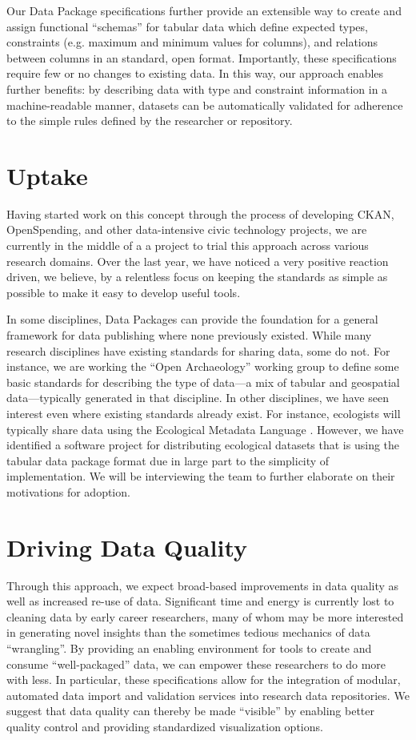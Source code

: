 \documentclass{idcc}
\begin{document}
Our Data Package specifications further provide an extensible way to
create and assign functional ``schemas'' for tabular data which define
expected types, constraints (e.g. maximum and minimum values for
columns), and relations between columns in an standard, open
format. Importantly, these specifications require few or no changes to
existing data. In this way, our approach enables further benefits: by
describing data with type and constraint information in a
machine-readable manner, datasets can be automatically validated for
adherence to the simple rules defined by the researcher or repository.

\section{Uptake}
Having started work on this concept through the process of developing
CKAN, OpenSpending, and other data-intensive civic technology
projects, we are currently in the middle of a a project to trial this
approach across various research domains.  Over the last year, we have
noticed a very positive reaction driven, we believe, by a relentless
focus on keeping the standards as simple as possible to make it easy
to develop useful tools.

In some disciplines, Data Packages can provide the foundation for a
general framework for data publishing where none previously existed.
While many research disciplines have existing standards for sharing
data, some do not.  For instance, we are working the ``Open
Archaeology'' working group to define some basic standards for
describing the type of data---a mix of tabular and geospatial
data---typically generated in that discipline.  In other disciplines,
we have seen interest even where existing standards already exist.
For instance, ecologists will typically share data using the
Ecological Metadata Language \cite{eml2016}.  However, we have
identified a software project for distributing ecological datasets
that is using the tabular data package format due in large part to the
simplicity of implementation.  We will be interviewing the team to
further elaborate on their motivations for adoption.

\section{Driving Data Quality}

Through this approach, we expect broad-based improvements in data
quality as well as increased re-use of data.  Significant time and
energy is currently lost to cleaning data by early career researchers,
many of whom may be more interested in generating novel insights than
the sometimes tedious mechanics of data ``wrangling''.  By providing
an enabling environment for tools to create and consume
``well-packaged'' data, we can empower these researchers to do more
with less.  In particular, these specifications allow for the
integration of modular, automated data import and validation services
into research data repositories.  We suggest that data quality can
thereby be made ``visible'' by enabling better quality control and
providing standardized visualization options.

\printbibliography
\end{document}
